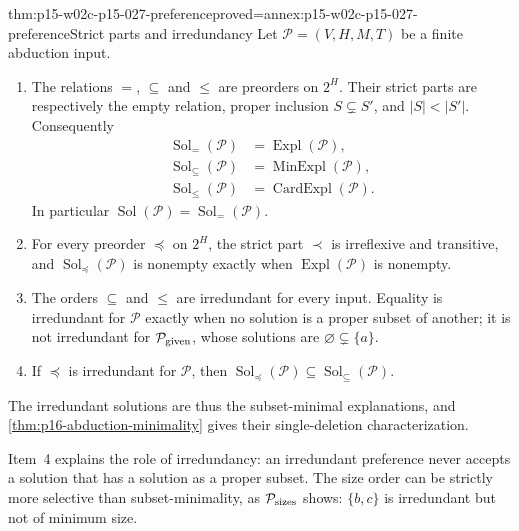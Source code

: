 \begin{hbtheorem}{thm:p15-w02c-p15-027-preference}{proved=annex:p15-w02c-p15-027-preference}{Strict parts and irredundancy}
Let \(\mathcal P=(V,H,M,T)\) be a finite abduction input.
\begin{enumerate}
\item The relations \(=\), \(\subseteq\) and \(\le\) are preorders on
      \(2^H\). Their strict parts are respectively the empty relation,
      proper inclusion \(S\subsetneq S'\), and \(|S|<|S'|\). Consequently
      \[
      \begin{aligned}
       \operatorname{Sol}_{=}(\mathcal P)&=\operatorname{Expl}(\mathcal P),\\
       \operatorname{Sol}_{\subseteq}(\mathcal P)&=\operatorname{MinExpl}(\mathcal P),\\
       \operatorname{Sol}_{\le}(\mathcal P)&=\operatorname{CardExpl}(\mathcal P).
      \end{aligned}
      \]
      In particular \(\operatorname{Sol}(\mathcal P)=\operatorname{Sol}_{=}(\mathcal P)\).
\item For every preorder \(\preceq\) on \(2^H\), the strict part \(\prec\)
      is irreflexive and transitive, and
      \(\operatorname{Sol}_{\preceq}(\mathcal P)\) is nonempty exactly when
      \(\operatorname{Expl}(\mathcal P)\) is nonempty.
\item The orders \(\subseteq\) and \(\le\) are irredundant for every input.
      Equality is irredundant for \(\mathcal P\) exactly when no solution
      is a proper subset of another; it is not irredundant for
      \(\mathcal P_{\rm given}\), whose solutions are
      \(\varnothing\subsetneq\{a\}\).
\item If \(\preceq\) is irredundant for \(\mathcal P\), then
      \(\operatorname{Sol}_{\preceq}(\mathcal P)
        \subseteq\operatorname{Sol}_{\subseteq}(\mathcal P)\).
\end{enumerate}
The irredundant solutions are thus the subset-minimal explanations, and
\cref{thm:p16-abduction-minimality} gives their single-deletion
characterization.
\end{hbtheorem}

Item~4 explains the role of irredundancy: an irredundant preference never
accepts a solution that has a solution as a proper subset. The size order
can be strictly more selective than subset-minimality, as
\(\mathcal P_{\rm sizes}\) shows: \(\{b,c\}\) is irredundant but not of
minimum size.

